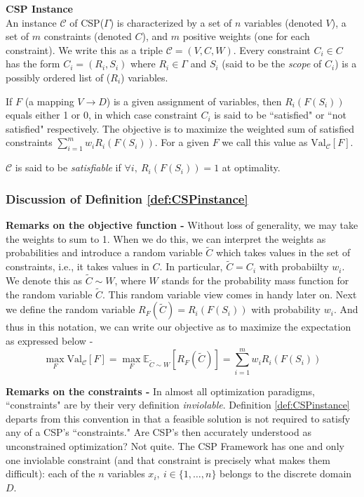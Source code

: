 \begin{definition}
\textbf{CSP Instance}\\
An instance $\mathcal{C}$ of CSP($\Gamma$) is characterized by a set of $n$ variables (denoted $V$), a set of $m$ constraints (denoted $C$), and $m$ positive weights (one for each constraint). We write this as a triple $\mathcal{C} = (V,C,W)$.
Every constraint $C_i \in C$ has the form $C_i = (R_i,S_i)$ where $R_i \in \Gamma$ and $S_i$ (said to be the \textit{scope} of $C_i$) is a possibly ordered list of ($R_i$) variables. 

If $F$ (a mapping $ V\to D$) is a given assignment of variables, then $R_i(F(S_i))$ equals either 1 or 0, in which case constraint $C_i$ is said to be ``satisfied" or ``not satisfied" respectively.
The objective is to maximize the weighted sum of satisfied constraints $\sum_{i = 1}^m w_i R_i(F(S_i))$. For a given $F$ we call this value as  $\text{Val}_{\mathcal{C}}[F]$.

$\mathcal{C}$ is said to be \textit{satisfiable} if $\forall i, ~ R_i(F(S_i)) = 1$ at optimality.
\label{def:CSPinstance}
\end{definition}

\subsubsection{Discussion of Definition \ref{def:CSPinstance}}
\textbf{Remarks on the objective function - }Without loss of generality, we may take the weights to sum to 1. 
When we do this, we can interpret the weights as probabilities and introduce a random variable $\tilde{C}$  which takes values in the set of constraints, i.e., it takes values in $C$. In particular, $\tilde{C} = C_i$ with probabiilty $w_i$. We denote this as $ \tilde{C} \sim W$, where $W$ stands for the probability mass function for the random variable $\tilde{C}$. This random variable view comes in handy later on. Next we define the random variable $R_F(\tilde{C}) = R_i(F(S_i))$ with probability $w_i$. And thus in this notation, we can write our objective as to maximize the expectation as expressed below -
\begin{equation} \label{expfirst}
\max_{F}  \text{Val}_{\mathcal{C}}[F] = \max_F \mathbb{E}_{\tilde{C} \sim W}\left[R_F(\tilde{C})\right] = \sum_{i=1}^m w_i R_i(F(S_i))
\end{equation}


\textbf{Remarks on the constraints - }In almost all optimization paradigms, ``constraints" are by their very definition \textit{inviolable}. 
Definition \ref{def:CSPinstance} departs from this convention in that a feasible solution is not required to satisfy any of a CSP's ``constraints." 
Are CSP's then accurately understood as unconstrained optimization? 
Not quite. 
The CSP Framework has one and only one inviolable constraint (and that constraint is precisely what makes them difficult): each of the $n$ variables $x_i, ~ i \in\{1,\ldots,n\}$ belongs to the discrete domain $D$. 

